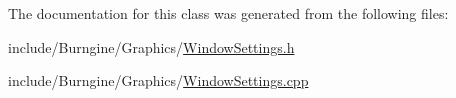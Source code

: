 The documentation for this class was generated from the following files\-:\begin{DoxyCompactItemize}
\item 
include/\-Burngine/\-Graphics/\hyperlink{_window_settings_8h}{Window\-Settings.\-h}\item 
include/\-Burngine/\-Graphics/\hyperlink{_window_settings_8cpp}{Window\-Settings.\-cpp}\end{DoxyCompactItemize}
